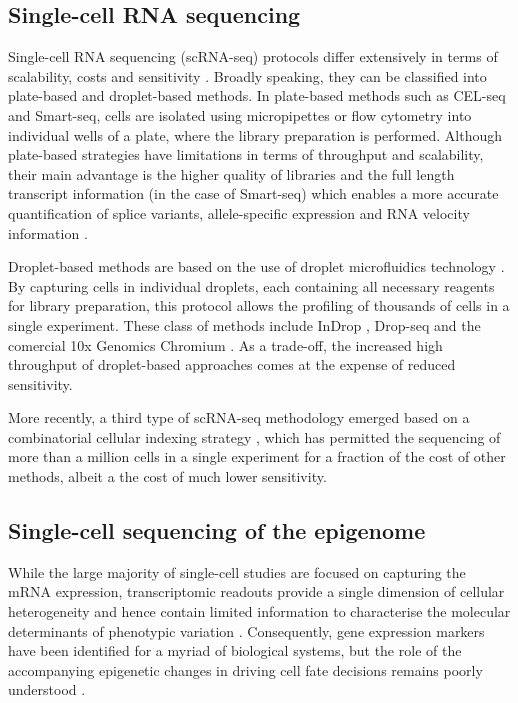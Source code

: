 \subsection{Single-cell RNA sequencing} \label{section:rna_expresssion}

Single-cell RNA sequencing (scRNA-seq) protocols differ extensively in terms of scalability, costs and sensitivity \cite{Svensson2018, Lafzi2018}. Broadly speaking, they can be classified into plate-based and droplet-based methods. In plate-based methods such as CEL-seq \cite{Hashimshony2012} and Smart-seq\cite{Ramskold2012, Picelli2014}, cells are isolated using micropipettes or flow cytometry into individual wells of a plate, where the library preparation is performed. Although plate-based strategies have limitations in terms of throughput and scalability, their main advantage is the higher quality of libraries and the full length transcript information (in the case of Smart-seq) which enables a more accurate quantification of splice variants\cite{Huang2017}, allele-specific expression\cite{Deng2014} and RNA velocity information \cite{LaManno2018}.
	
Droplet-based methods are based on the use of droplet microfluidics technology \cite{Zhang2019}. By capturing cells in individual droplets, each containing all necessary reagents for library preparation, this protocol allows the profiling of thousands of cells in a single experiment. These class of methods include InDrop \cite{Klein2015,Zilionis2016}, Drop-seq\cite{Macosko2015} and the comercial 10x Genomics Chromium \cite{Zheng2017}. As a trade-off, the increased high throughput of droplet-based approaches comes at the expense of reduced sensitivity\cite{Ziegenhain2017,Wang2019,Svensson2017}.

More recently, a third type of scRNA-seq methodology emerged based on a combinatorial cellular indexing strategy \cite{Cao2017,Rosenberg2018,Cao2019}, which has permitted the sequencing of more than a million cells in a single experiment for a fraction of the cost of other methods, albeit a the cost of much lower sensitivity.

\subsection{Single-cell sequencing of the epigenome}

While the large majority of single-cell studies are focused on capturing the mRNA expression, transcriptomic readouts provide a single dimension of cellular heterogeneity and hence contain limited information to characterise the molecular determinants of phenotypic variation \cite{Ritchie2015}. Consequently, gene expression markers have been identified for a myriad of biological systems, but the role of the accompanying epigenetic changes in driving cell fate decisions remains poorly understood \cite{Griffiths2018,Kelsey2017,Bheda2014}.


